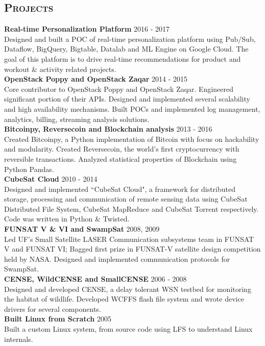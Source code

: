 \begin{resume}
\section{\textsc{Projects}}
\textbf{Real-time Personalization Platform} \hfill 2016 - 2017\\
Designed and built a POC of real-time personalization platform using Pub/Sub, Dataflow, BigQuery, Bigtable, Datalab and ML Engine on Google Cloud. The goal of this platform is to drive real-time recommendations for product and workout \& activity related projects.\\
\textbf{OpenStack Poppy and OpenStack Zaqar} \hfill 2014 - 2015\\
Core contributor to OpenStack Poppy and OpenStack Zaqar. Engineered significant portion of their APIs. Designed and implemented several scalability and high availability mechanisms. Built POCs and implemented log management, analytics, billing, streaming analysis solutions.\\
\textbf{Bitcoinpy, Reversecoin and Blockchain analysis} \hfill 2013 - 2016\\
Created Bitcoinpy, a Python implementation of Bitcoin with focus on hackability and modularity. Created Reversecoin, the world's first cryptocurrency with reversible transactions. Analyzed statistical properties of Blockchain using Python Pandas.\\
\textbf{CubeSat Cloud} \hfill 2010 - 2014 \\
Designed and implemented ``CubeSat Cloud", a framework for distributed storage, processing and communication of remote sensing data using CubeSat Distributed File System, CubeSat MapReduce and CubeSat Torrent respectively. Code was written in Python \& Twisted.\\
\textbf{FUNSAT V \& VI and SwampSat} \hfill 2008, 2009 \\
Led UF's Small Satellite LASER Communication subsystems team in FUNSAT V and FUNSAT VI; Bagged first prize in FUNSAT-V satellite design competition held by NASA. Designed and implemented communication protocols for SwampSat.\\
\textbf{CENSE, WildCENSE and SmallCENSE} \hfill 2006 - 2008\\
Designed and developed CENSE, a delay tolerant WSN testbed for monitoring the habitat of wildlife. Developed WCFFS flash file system and wrote device drivers for several components.\\
\textbf{Built Linux from Scratch} \hfill 2005 \\
Built a custom Linux system, from source code using LFS to understand Linux internals.


\end{resume}
